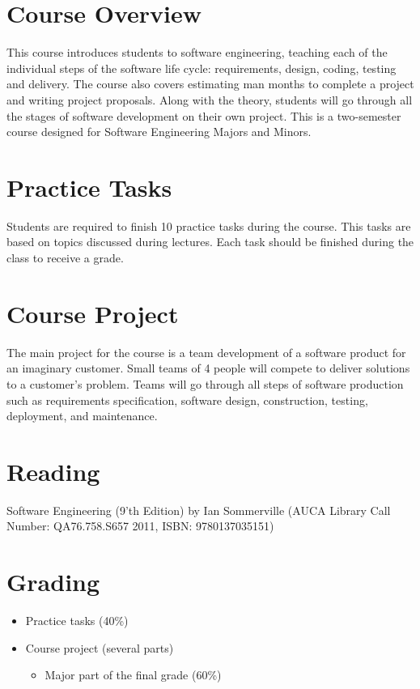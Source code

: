 \documentclass[12pt,a4paper,oneside]{article}
\begin{document}
    \section{Course Overview}

        This course introduces students to software engineering, teaching each of the individual steps of the software life cycle: requirements, design, coding, testing and delivery. The course also covers estimating man months to complete a project and writing project proposals. Along with the theory, students will go through all the stages of software development on their own project. This is a two-semester course designed for Software Engineering Majors and Minors.

    \section{Practice Tasks}

        Students are required to finish 10 practice tasks during the course. This tasks are based on topics discussed during lectures. Each task should be finished during the class to receive a grade.

    \section{Course Project}

        The main project for the course is a team development of a software product for an imaginary customer. Small teams of 4 people will compete to deliver solutions to a customer's problem. Teams will go through all steps of software production such as requirements specification, software design, construction, testing, deployment, and maintenance.

    \section{Reading}

        Software Engineering (9'th Edition) by Ian Sommerville (AUCA Library Call Number: QA76.758.S657 2011, ISBN: 9780137035151)

    \section{Grading}

        \begin{itemize}
            \item Practice tasks (40\%)
            \item Course project (several parts)
            \begin{itemize}
                \item Major part of the final grade (60\%)
            \end{itemize}
        \end{itemize}
\end{document}
